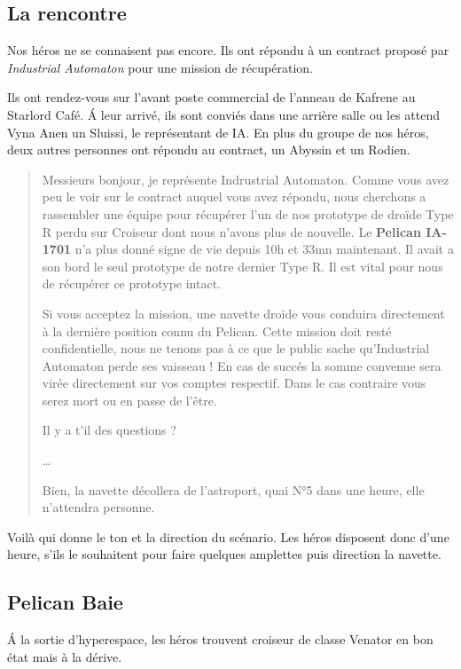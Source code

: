 \documentclass{jdrp}
\begin{document}
\subsection{La rencontre}
Nos héros ne se connaisent pas encore. Ils ont répondu à un contract proposé par \emph{Industrial Automaton} pour une mission de récupération.

Ils ont rendez-vous sur l'avant poste commercial de l'anneau de Kafrene au Starlord Café. \'A leur arrivé, ils sont conviés dans une arrière salle ou les attend Vyna Anen un Sluissi, le représentant de IA. En plus du groupe de nos héros, deux autres personnes ont répondu au contract, un Abyssin et un Rodien.

\begin{quote}
	Messieurs bonjour, je représente Indrustrial Automaton.
	Comme vous avez peu le voir sur le contract auquel vous avez répondu, nous cherchons a rassembler une équipe pour récupérer l'un de nos prototype de droïde Type R perdu sur Croiseur dont nous n'avons plus de nouvelle.
	Le \textbf{Pelican IA-1701} n'a plus donné signe de vie depuis 10h et 33mn maintenant. Il avait a son bord le seul prototype de notre dernier Type R. Il est vital pour nous de récupérer ce prototype intact.

	Si vous acceptez la mission, une navette droïde vous conduira directement à la dernière position connu du Pelican. Cette mission doit resté confidentielle, nous ne tenons pas à ce que le public sache qu'Industrial Automaton perde ses vaisseau !
	En cas de succés la somme convenue sera virée directement sur vos comptes respectif. Dans le cas contraire vous serez mort ou en passe de l'être.

	Il y a t'il des questions ?

	\ldots

	Bien, la navette décollera de l'astroport, quai N°5 dans une heure, elle n'attendra personne.
\end{quote}

Voilà qui donne le ton et la direction du scénario. Les héros disposent donc d'une heure, s'ils le souhaitent pour faire quelques amplettes puis direction la navette.

\subsection{Pelican Baie}
\begin{flushright} 
	\begin{minipage}[r]{0.7\linewidth}
		\hspace{-2\baselineskip}\'A la sortie d'hyperespace, les héros trouvent croiseur de classe Venator en bon état mais à la dérive.
	\end{minipage}
\end{flushright} 
\end{document}
